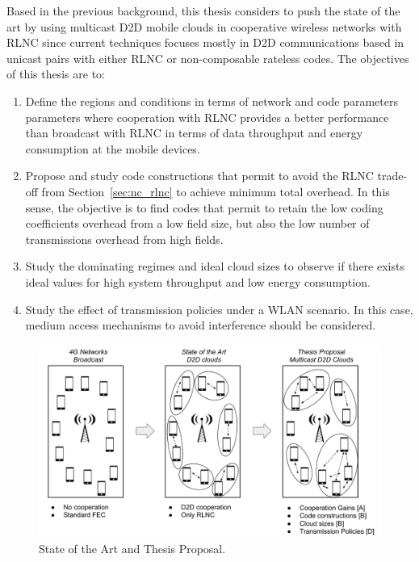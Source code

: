 

Based in the previous background, this thesis considers to push the state of the art by using multicast \ac{D2D} mobile clouds in cooperative wireless networks with \ac{RLNC} since current techniques focuses mostly in \ac{D2D} communications based in unicast pairs with either \ac{RLNC} or non-composable rateless codes. The objectives of this thesis are to:

\begin{enumerate}

\item Define the regions and conditions in terms of network and code parameters parameters where cooperation with \ac{RLNC} provides a better performance than broadcast with \ac{RLNC} in terms of data throughput and energy consumption at the mobile devices.

\item Propose and study code constructions that permit to avoid the \ac{RLNC} trade-off from Section~\ref{sec:nc_rlnc} to achieve minimum total overhead. In this sense, the objective is to find codes that permit to retain the low coding coefficients overhead from a low field size, but also the low number of transmissions overhead from high fields.

\item Study the dominating regimes and ideal cloud sizes to observe if there exists ideal values for high system throughput and low energy consumption.

\item Study the effect of transmission policies under a \ac{WLAN} scenario. In this case, medium access mechanisms to avoid interference should be considered.
\end{enumerate}

\begin{figure}[h]
  \centering
  \includegraphics[width=\textwidth]{introduction/figures/thesis-diagrams.pdf}
  \caption{State of the Art and Thesis Proposal.}
\label{fig:proposal}
\end{figure}

